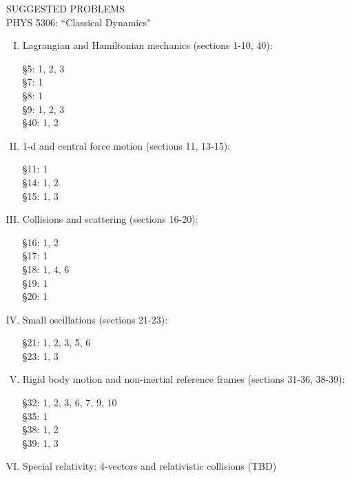 \documentclass[10pt]{article}
\numberwithin{equation}{section}
\def\ben{\begin{enumerate}}
\def\een{\end{enumerate}}
\def\i{\item{}}
\begin{document}
\begin{center}
SUGGESTED PROBLEMS\\
PHYS 5306: ``Classical Dynamics"\\
\end{center}

\ben[I.]

\i Lagrangian and Hamiltonian mechanics (sections 1-10, 40):

\S 5: 1, 2, 3\\
\S 7: 1\\ 
\S 8: 1\\
\S 9: 1, 2, 3\\ 
\S 40: 1, 2

\i 1-d and central force motion (sections 11, 13-15):

\S 11: 1\\
\S 14: 1, 2\\ 
\S 15: 1, 3

\i Collisions and scattering (sections 16-20):

\S 16: 1, 2\\
\S 17: 1\\
\S 18: 1, %
4, 6\\
\S 19: 1\\
\S 20: 1

\i Small oscillations (sections 21-23):

\S 21: 1, 2, 3, 5, 6\\
\S 23: 1, 3

\i Rigid body motion and non-inertial reference frames (sections 31-36, 38-39):

\S 32: 1, 2, 3, 6, 7, 9, 10\\
\S 35: 1\\ %
\S 38: 1, 2\\
\S 39: 1, 3

\i Special relativity: 4-vectors and relativistic collisions  (TBD)

\een
\end{document}

